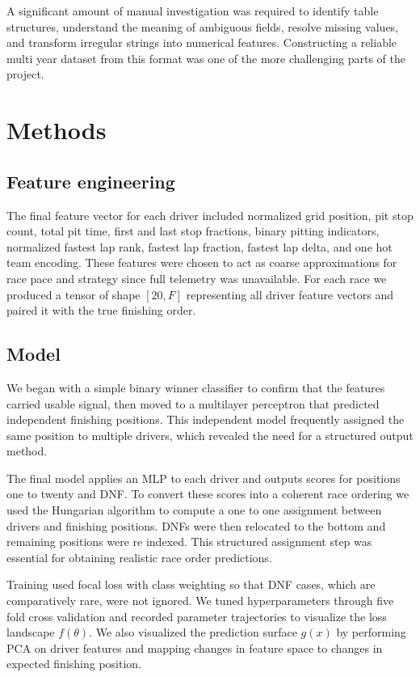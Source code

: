 \documentclass[12pt]{article}
\begin{document}
A significant amount of manual investigation was required to identify table structures, understand the meaning of ambiguous fields, resolve missing values, and transform irregular strings into numerical features. Constructing a reliable multi year dataset from this format was one of the more challenging parts of the project.

\section{Methods}

\subsection*{Feature engineering}

The final feature vector for each driver included normalized grid position, pit stop count, total pit time, first and last stop fractions, binary pitting indicators, normalized fastest lap rank, fastest lap fraction, fastest lap delta, and one hot team encoding. These features were chosen to act as coarse approximations for race pace and strategy since full telemetry was unavailable. For each race we produced a tensor of shape \([20, F]\) representing all driver feature vectors and paired it with the true finishing order.

\subsection*{Model}

We began with a simple binary winner classifier to confirm that the features carried usable signal, then moved to a multilayer perceptron that predicted independent finishing positions. This independent model frequently assigned the same position to multiple drivers, which revealed the need for a structured output method.

The final model applies an MLP to each driver and outputs scores for positions one to twenty and DNF. To convert these scores into a coherent race ordering we used the Hungarian algorithm to compute a one to one assignment between drivers and finishing positions. DNFs were then relocated to the bottom and remaining positions were re indexed. This structured assignment step was essential for obtaining realistic race order predictions.

Training used focal loss with class weighting so that DNF cases, which are comparatively rare, were not ignored. We tuned hyperparameters through five fold cross validation and recorded parameter trajectories to visualize the loss landscape \(f(\theta)\). We also visualized the prediction surface \(g(x)\) by performing PCA on driver features and mapping changes in feature space to changes in expected finishing position.
\end{document}

